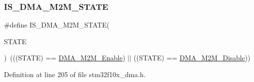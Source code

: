 \subsubsection{\texorpdfstring{I\+S\+\_\+\+D\+M\+A\+\_\+\+M2\+M\+\_\+\+S\+T\+A\+TE}{IS\_DMA\_M2M\_STATE}}
{\footnotesize\ttfamily \#define I\+S\+\_\+\+D\+M\+A\+\_\+\+M2\+M\+\_\+\+S\+T\+A\+TE(\begin{DoxyParamCaption}\item[{}]{S\+T\+A\+TE }\end{DoxyParamCaption})~(((S\+T\+A\+TE) == \hyperlink{group___d_m_a__memory__to__memory_ga046a1de15235c254c0511c08cae3065a}{D\+M\+A\+\_\+\+M2\+M\+\_\+\+Enable}) $\vert$$\vert$ ((S\+T\+A\+TE) == \hyperlink{group___d_m_a__memory__to__memory_ga86e0a7076f0badd509fac6576f3b5355}{D\+M\+A\+\_\+\+M2\+M\+\_\+\+Disable}))}



Definition at line 205 of file stm32f10x\+\_\+dma.\+h.

